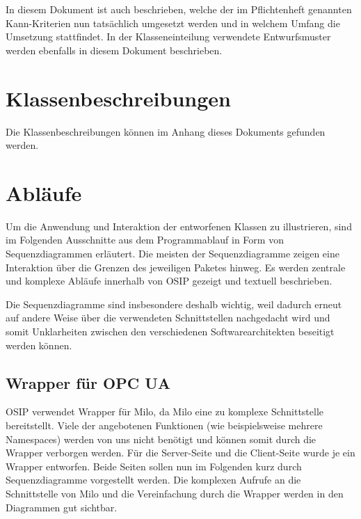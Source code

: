 \documentclass[parskip=full]{scrartcl}
\begin{document}
In diesem Dokument ist auch beschrieben, welche der im Pflichtenheft genannten Kann-Kriterien nun tatsächlich
umgesetzt werden und in welchem Umfang die Umsetzung stattfindet. In der Klasseneinteilung verwendete Entwurfsmuster werden
ebenfalls in diesem Dokument beschrieben.

\section{Klassenbeschreibungen}
Die Klassenbeschreibungen können im Anhang dieses Dokuments gefunden werden.

\section{Abläufe}
Um die Anwendung und Interaktion der entworfenen Klassen zu illustrieren, sind im Folgenden Ausschnitte aus dem Programmablauf
in Form von Sequenzdiagrammen erläutert. Die meisten der Sequenzdiagramme zeigen eine Interaktion über die Grenzen
des jeweiligen Paketes hinweg. Es werden zentrale und komplexe Abläufe innerhalb von OSIP gezeigt und textuell beschrieben.

Die Sequenzdiagramme sind insbesondere deshalb wichtig, weil dadurch erneut auf andere Weise über die verwendeten Schnittstellen
nachgedacht wird und somit Unklarheiten zwischen den verschiedenen Softwarearchitekten beseitigt werden können.

\subsection{Wrapper für OPC UA}
OSIP verwendet Wrapper für Milo, da Milo eine zu komplexe Schnittstelle bereitstellt.
Viele der angebotenen Funktionen (wie beispielsweise mehrere Namespaces) werden von uns nicht benötigt
und können somit durch die Wrapper verborgen werden. Für die Server-Seite und die Client-Seite wurde je ein Wrapper entworfen.
Beide Seiten sollen nun im Folgenden kurz durch Sequenzdiagramme vorgestellt werden.
Die komplexen Aufrufe an die Schnittstelle von Milo und die Vereinfachung durch die Wrapper werden in den Diagrammen gut sichtbar.
\end{document}
